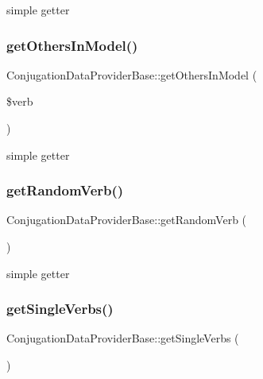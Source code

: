 simple getter \hypertarget{classConjugationDataProviderBase_a964e48a9e1d9c507fdb19e96737c09e4}{}\label{classConjugationDataProviderBase_a964e48a9e1d9c507fdb19e96737c09e4} 
\subsubsection{\texorpdfstring{get\+Others\+In\+Model()}{getOthersInModel()}}
{\footnotesize\ttfamily Conjugation\+Data\+Provider\+Base\+::get\+Others\+In\+Model (\begin{DoxyParamCaption}\item[{}]{\$verb }\end{DoxyParamCaption})\hspace{0.3cm}{\ttfamily [abstract]}}

simple getter \hypertarget{classConjugationDataProviderBase_aa23d566d02578adb55592bba5a796fa8}{}\label{classConjugationDataProviderBase_aa23d566d02578adb55592bba5a796fa8} 
\subsubsection{\texorpdfstring{get\+Random\+Verb()}{getRandomVerb()}}
{\footnotesize\ttfamily Conjugation\+Data\+Provider\+Base\+::get\+Random\+Verb (\begin{DoxyParamCaption}{ }\end{DoxyParamCaption})\hspace{0.3cm}{\ttfamily [abstract]}}

simple getter \hypertarget{classConjugationDataProviderBase_a3a209dff42ff754afa7c81a8182266d7}{}\label{classConjugationDataProviderBase_a3a209dff42ff754afa7c81a8182266d7} 
\subsubsection{\texorpdfstring{get\+Single\+Verbs()}{getSingleVerbs()}}
{\footnotesize\ttfamily Conjugation\+Data\+Provider\+Base\+::get\+Single\+Verbs (\begin{DoxyParamCaption}{ }\end{DoxyParamCaption})\hspace{0.3cm}{\ttfamily [abstract]}}

